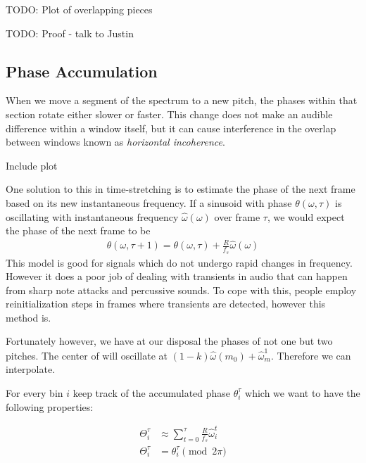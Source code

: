 \documentclass[12pt]{article}
\begin{document}
TODO: Plot of overlapping pieces

TODO: Proof - talk to Justin


\newpage
\subsection{Phase Accumulation}

When we move a segment of the spectrum to a new pitch, 
the phases within that section rotate either slower or faster.
This change does not make an audible difference within a window itself,
but it can cause interference in the overlap between windows known as \emph{horizontal incoherence}.

Include plot

One solution to this in time-stretching is to estimate the phase of the next frame based on its new instantaneous frequency. 
If a sinusoid with phase $\theta(\omega, \tau)$ 
is oscillating with instantaneous frequency $\hat{\omega}(\omega)$ over frame $\tau$, we would expect the phase of the next frame to be
\begin{align}
  \theta(\omega, \tau+1) = 
  \theta(\omega,\tau) + \frac{R}{f_s}\hat{\omega}(\omega)
\end{align}
This model is good for signals which do not undergo rapid changes in frequency. 
However it does a poor job of dealing with transients in audio that can happen from sharp note attacks and percussive sounds. 
To cope with this, people employ reinitialization steps in frames where transients are detected, however this method is.

Fortunately however, we have at our disposal the phases of not one but two pitches.
The center of  will oscillate at $(1 - k)\hat{\omega}(m_0) + \hat{\omega}^1_m$.
Therefore we can interpolate.

For every bin $i$ keep track of the accumulated phase $\theta_i^\tau$ which we want to have the following properties:

\begin{align}
  \Theta_i^\tau &\approx
  \sum_{t = 0}^\tau 
  \frac{R}{f_s}\hat{\omega}_i^t\\
  \Theta_i^\tau &= \theta_i^\tau\pmod{2\pi}
\end{align}
\end{document}
